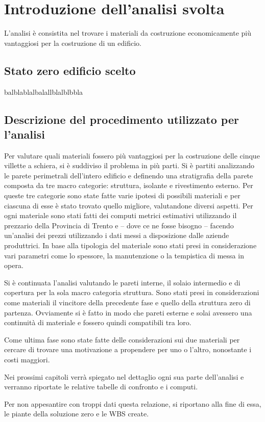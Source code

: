 \chapter{Introduzione dell'analisi svolta}
L'analisi è consistita nel trovare i materiali da costruzione economicamente più vantaggiosi per la costruzione di un edificio. 
\section{Stato zero edificio scelto}
balblablalbalallblalblbbla
\section{Descrizione del procedimento utilizzato per l'analisi}
Per valutare quali materiali fossero più vantaggiosi per la costruzione delle cinque villette a schiera, si è suddiviso il problema in più parti.
Si è partiti analizzando le parete perimetrali dell'intero edificio e definendo una stratigrafia della parete composta da tre macro categorie: struttura, isolante e rivestimento esterno.
Per queste tre categorie sono state fatte varie ipotesi di possibili materiali e per ciascuna di esse è stato trovato quello migliore, valutandone diversi aspetti. 
Per ogni materiale sono stati fatti dei computi metrici estimativi utilizzando il prezzario della Provincia di Trento e -- dove ce ne fosse bisogno -- facendo un'analisi dei prezzi utilizzando i dati messi a disposizione dalle aziende produttrici.
In base alla tipologia del materiale sono stati presi in considerazione vari parametri come lo spessore, la manutenzione o la tempistica di messa in opera.

Si è continuata l'analisi valutando le pareti interne, il solaio intermedio e di copertura per la sola macro categoria struttura. 
Sono stati presi in considerazioni come materiali il vincitore della precedente fase e quello della struttura zero di partenza.
Ovviamente si è fatto in modo che pareti esterne e solai avessero una continuità di materiale e fossero quindi compatibili tra loro.

Come ultima fase sono state fatte delle considerazioni sui due materiali per cercare di trovare una motivazione a propendere per uno o l'altro, nonostante i costi maggiori. 

Nei prossimi capitoli verrà spiegato nel dettaglio ogni sua parte dell'analisi e verranno riportate le relative tabelle di confronto e i computi.

Per non appesantire con troppi dati questa relazione, si riportano alla fine di essa, le piante della soluzione zero e le WBS create.
%
%